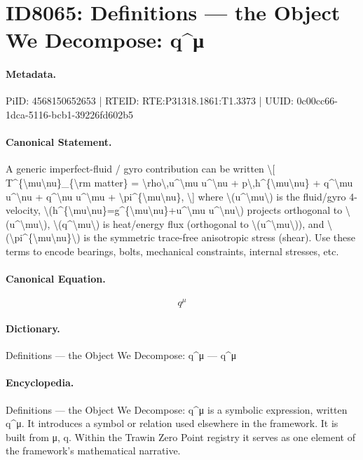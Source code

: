 \section*{ID8065: Definitions — the Object We Decompose: q\textasciicircum{}μ}
\paragraph{Metadata.}
PiID: 4568150652653 | RTEID: RTE:P31318.1861:T1.3373 | UUID: 0c00cc66-1dca-5116-bcb1-39226fd602b5

\paragraph{Canonical Statement.}
A generic imperfect-fluid / gyro contribution can be written \textbackslash{}[ T\textasciicircum{}\{\textbackslash{}mu\textbackslash{}nu\}\_\{\textbackslash{}rm matter\} = \textbackslash{}rho\textbackslash{},u\textasciicircum{}\textbackslash{}mu u\textasciicircum{}\textbackslash{}nu + p\textbackslash{},h\textasciicircum{}\{\textbackslash{}mu\textbackslash{}nu\} + q\textasciicircum{}\textbackslash{}mu u\textasciicircum{}\textbackslash{}nu + q\textasciicircum{}\textbackslash{}nu u\textasciicircum{}\textbackslash{}mu + \textbackslash{}pi\textasciicircum{}\{\textbackslash{}mu\textbackslash{}nu\}, \textbackslash{}] where \textbackslash{}(u\textasciicircum{}\textbackslash{}mu\textbackslash{}) is the fluid/gyro 4-velocity, \textbackslash{}(h\textasciicircum{}\{\textbackslash{}mu\textbackslash{}nu\}=g\textasciicircum{}\{\textbackslash{}mu\textbackslash{}nu\}+u\textasciicircum{}\textbackslash{}mu u\textasciicircum{}\textbackslash{}nu\textbackslash{}) projects orthogonal to \textbackslash{}(u\textasciicircum{}\textbackslash{}mu\textbackslash{}), \textbackslash{}(q\textasciicircum{}\textbackslash{}mu\textbackslash{}) is heat/energy flux (orthogonal to \textbackslash{}(u\textasciicircum{}\textbackslash{}mu\textbackslash{})), and \textbackslash{}(\textbackslash{}pi\textasciicircum{}\{\textbackslash{}mu\textbackslash{}nu\}\textbackslash{}) is the symmetric trace-free anisotropic stress (shear). Use these terms to encode bearings, bolts, mechanical constraints, internal stresses, etc.

\paragraph{Canonical Equation.}
\[
q^\mu
\]

\paragraph{Dictionary.}
Definitions — the Object We Decompose: q\textasciicircum{}μ — q\textasciicircum{}μ

\paragraph{Encyclopedia.}
Definitions — the Object We Decompose: q\textasciicircum{}μ is a symbolic expression, written q\textasciicircum{}μ. It introduces a symbol or relation used elsewhere in the framework. It is built from μ, q. Within the Trawin Zero Point registry it serves as one element of the framework's mathematical narrative.
